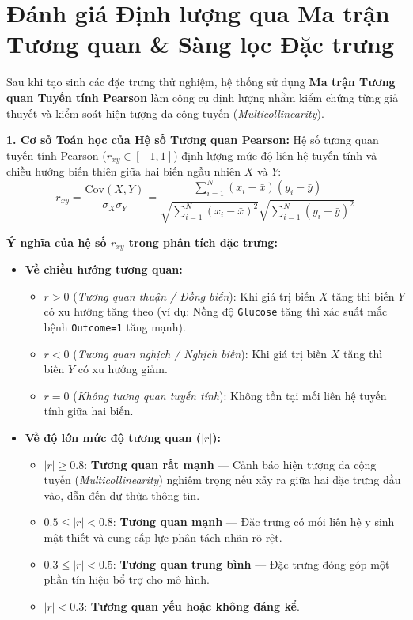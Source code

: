 \documentclass[12pt,a4paper]{report}
\begin{document}
\section{Đánh giá Định lượng qua Ma trận Tương quan \& Sàng lọc Đặc trưng}

Sau khi tạo sinh các đặc trưng thử nghiệm, hệ thống sử dụng \textbf{Ma trận Tương quan Tuyến tính Pearson} làm công cụ định lượng nhằm kiểm chứng từng giả thuyết và kiểm soát hiện tượng đa cộng tuyến (\textit{Multicollinearity}).

\textbf{1. Cơ sở Toán học của Hệ số Tương quan Pearson:}
Hệ số tương quan tuyến tính Pearson ($r_{xy} \in [-1, 1]$) định lượng mức độ liên hệ tuyến tính và chiều hướng biến thiên giữa hai biến ngẫu nhiên $X$ và $Y$:
\begin{equation}
r_{xy} = \frac{\text{Cov}(X, Y)}{\sigma_X \sigma_Y} = \frac{\sum_{i=1}^N (x_i - \bar{x})(y_i - \bar{y})}{\sqrt{\sum_{i=1}^N (x_i - \bar{x})^2} \sqrt{\sum_{i=1}^N (y_i - \bar{y})^2}}
\end{equation}

\textbf{Ý nghĩa của hệ số $r_{xy}$ trong phân tích đặc trưng:}
\begin{itemize}[leftmargin=1.5em]
    \item \textbf{Về chiều hướng tương quan:}
    \begin{itemize}[leftmargin=1.2em]
        \item $r > 0$ (\textit{Tương quan thuận / Đồng biến}): Khi giá trị biến $X$ tăng thì biến $Y$ có xu hướng tăng theo (ví dụ: Nồng độ \texttt{Glucose} tăng thì xác suất mắc bệnh \texttt{Outcome=1} tăng mạnh).
        \item $r < 0$ (\textit{Tương quan nghịch / Nghịch biến}): Khi giá trị biến $X$ tăng thì biến $Y$ có xu hướng giảm.
        \item $r = 0$ (\textit{Không tương quan tuyến tính}): Không tồn tại mối liên hệ tuyến tính giữa hai biến.
    \end{itemize}
    \item \textbf{Về độ lớn mức độ tương quan ($|r|$):}
    \begin{itemize}[leftmargin=1.2em]
        \item $|r| \ge 0.8$: \textbf{Tương quan rất mạnh} — Cảnh báo hiện tượng đa cộng tuyến (\textit{Multicollinearity}) nghiêm trọng nếu xảy ra giữa hai đặc trưng đầu vào, dẫn đến dư thừa thông tin.
        \item $0.5 \le |r| < 0.8$: \textbf{Tương quan mạnh} — Đặc trưng có mối liên hệ y sinh mật thiết và cung cấp lực phân tách nhãn rõ rệt.
        \item $0.3 \le |r| < 0.5$: \textbf{Tương quan trung bình} — Đặc trưng đóng góp một phần tín hiệu bổ trợ cho mô hình.
        \item $|r| < 0.3$: \textbf{Tương quan yếu hoặc không đáng kể}.
    \end{itemize}
\end{itemize}
\end{document}
